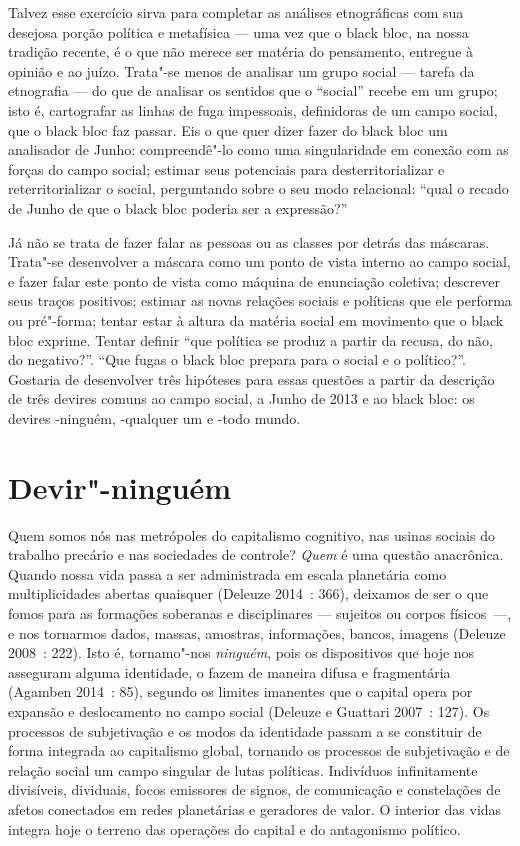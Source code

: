 Talvez esse exercício sirva para completar as análises etnográficas com
sua desejosa porção política e metafísica --- uma vez que o black bloc,
na nossa tradição recente, é o que não merece ser matéria do pensamento,
entregue à opinião e ao juízo. Trata"-se menos de analisar um grupo
social --- tarefa da etnografia --- do que de analisar os sentidos que o
``social'' recebe em um grupo; isto é, cartografar as linhas de fuga
impessoais, definidoras de um campo social, que o black bloc faz passar.
Eis o que quer dizer fazer do black bloc um analisador de Junho:
compreendê"-lo como uma singularidade em conexão com as forças do campo
social; estimar seus potenciais para desterritorializar e
reterritorializar o social, perguntando sobre o seu modo relacional:
``qual o recado de Junho de que o black bloc poderia ser a expressão?''

Já não se trata de fazer falar as pessoas ou as classes por detrás das
máscaras. Trata"-se desenvolver a máscara como um ponto de vista interno
ao campo social, e fazer falar este ponto de vista como máquina de
enunciação coletiva; descrever seus traços positivos; estimar as novas
relações sociais e políticas que ele performa ou pré"-forma; tentar estar
à altura da matéria social em movimento que o black bloc exprime. Tentar
definir ``que política se produz a partir da recusa, do não, do
negativo?''. ``Que fugas o black bloc prepara para o social e o
político?''. Gostaria de desenvolver três hipóteses para essas questões
a partir da descrição de três devires comuns ao campo social, a Junho de
2013 e ao black bloc: os devires -ninguém, -qualquer um e -todo mundo.

\section{Devir"-ninguém}

Quem somos nós nas metrópoles do capitalismo
cognitivo, nas usinas sociais do trabalho precário e nas sociedades de
controle? \emph{Quem} é uma questão anacrônica. Quando nossa vida passa
a ser administrada em escala planetária como multiplicidades abertas
quaisquer (Deleuze 2014~: 366), deixamos de ser o que fomos para as
formações soberanas e disciplinares --- sujeitos ou corpos físicos~---, e
nos tornarmos dados, massas, amostras, informações, bancos, imagens
(Deleuze 2008~: 222). Isto é, tornamo"-nos \emph{ninguém}, pois os
dispositivos que hoje nos asseguram alguma identidade, o fazem de
maneira difusa e fragmentária (Agamben 2014~: 85), segundo os limites
imanentes que o capital opera por expansão e deslocamento no campo
social (Deleuze e Guattari 2007~: 127). Os processos de subjetivação e
os modos da identidade passam a se constituir de forma integrada ao
capitalismo global, tornando os processos de subjetivação e de relação
social um campo singular de lutas políticas. Indivíduos infinitamente
divisíveis, dividuais, focos emissores de signos, de comunicação e
constelações de afetos conectados em redes planetárias e geradores de
valor. O interior das vidas integra hoje o terreno das operações do
capital e do antagonismo político.

